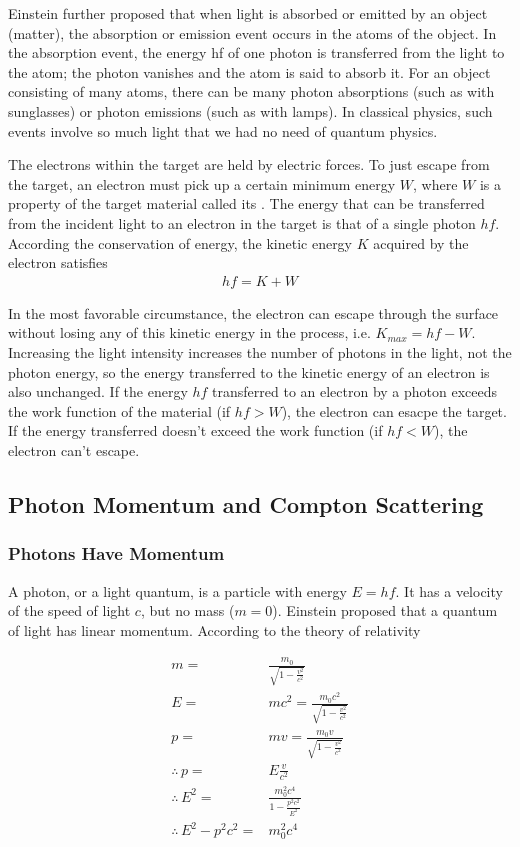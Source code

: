 Einstein further proposed that when light is absorbed or emitted by an object (matter), the absorption or emission event occurs in the atoms of the object. In the absorption event, the energy hf of one photon is transferred from the light to the atom; the photon vanishes and the atom is said to absorb it. For an object consisting of many atoms, there can be many photon absorptions (such as with sunglasses) or photon emissions (such as with lamps). In classical physics, such events involve so much light that we had no need of quantum physics.

The electrons within the target are held by electric forces. To just escape from the target, an electron must pick up a certain minimum energy $W$, where $W$ is a property of the target material called its . The energy that can be transferred from the incident light to an electron in the target is that of a single photon $hf$. According the conservation of energy, the kinetic energy $K$ acquired by the electron satisfies
\begin{align*}
    hf=K+W
\end{align*}

In the most favorable circumstance, the electron can escape through the surface without losing any of this kinetic energy in the process, i.e. $K_{max}=hf-W$. Increasing the light intensity increases the number of photons in the light, not the photon energy, so the energy transferred to the kinetic energy of an electron is also unchanged. If the energy $hf$ transferred to an electron by a photon exceeds the work function of the material (if $hf>W$), the electron can esacpe the target. If the energy transferred doesn't exceed the work function (if $hf<W$), the electron can't escape. 

\subsection{Photon Momentum and Compton Scattering}
\subsubsection{Photons Have Momentum}
A photon, or a light quantum, is a particle with energy $E=hf$. It has a velocity of the speed of light $c$, but no mass ($m=0$). Einstein proposed that a quantum of light has linear momentum. According to the theory of relativity

\quad

\begin{align*}
    m=&\frac{m_0}{\sqrt{1-\frac{v^2}{c^2}}}\\
    E=&mc^2=\frac{m_0c^2}{\sqrt{1-\frac{v^2}{c^2}}}\\
    p=&mv=\frac{m_0v}{\sqrt{1-\frac{v^2}{c^2}}}\\
    \therefore \, p=&E\frac{v}{c^2}\\
    \therefore \, E^2=&\frac{m_0^2 c^4}{1-\frac{p^2c^2}{E^2}}\\
    \therefore \, E^2-p^2 c^2=&m_0^2c^4
\end{align*}

